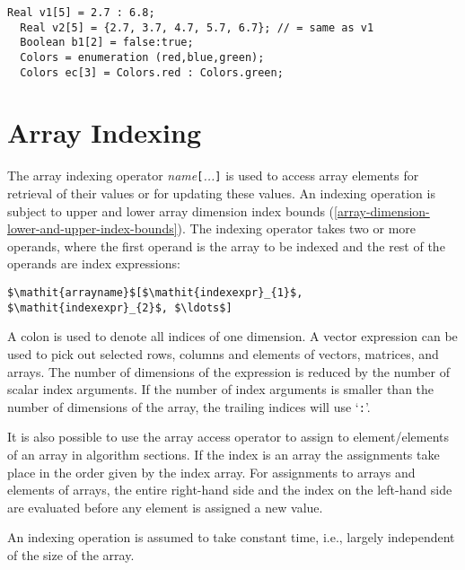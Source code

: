 \begin{example}
\begin{lstlisting}[language=modelica]
  Real v1[5] = 2.7 : 6.8;
  Real v2[5] = {2.7, 3.7, 4.7, 5.7, 6.7}; // = same as v1
  Boolean b1[2] = false:true;
  Colors = enumeration (red,blue,green);
  Colors ec[3] = Colors.red : Colors.green;
\end{lstlisting}
\end{example}

\section{Array Indexing}

The array indexing operator \emph{name}\lstinline![!\emph{...}\lstinline!]! is used to
access array elements for retrieval of their values or for updating
these values. An indexing operation is subject to upper and lower array
dimension index bounds (\autoref{array-dimension-lower-and-upper-index-bounds}).  The indexing operator takes two or more
operands, where the first operand is the array to be indexed and the rest of the operands are index expressions:

\lstinline[mathescape=true]!$\mathit{arrayname}$[$\mathit{indexexpr}_{1}$, $\mathit{indexexpr}_{2}$, $\ldots$]!

A colon is used to denote all indices of one dimension. A vector
expression can be used to pick out selected rows, columns and elements
of vectors, matrices, and arrays. The number of dimensions of the
expression is reduced by the number of scalar index arguments. If the
number of index arguments is smaller than the number of dimensions of
the array, the trailing indices will use `\lstinline!:!'.

It is also possible to use the array access operator to assign to
element/elements of an array in algorithm sections. If the index is an
array the assignments take place in the order given by the index array.
For assignments to arrays and elements of arrays, the entire right-hand
side and the index on the left-hand side are evaluated before any
element is assigned a new value.

\begin{nonnormative}
An indexing operation is assumed to take constant time, i.e., largely independent of the size of the array.
\end{nonnormative}

